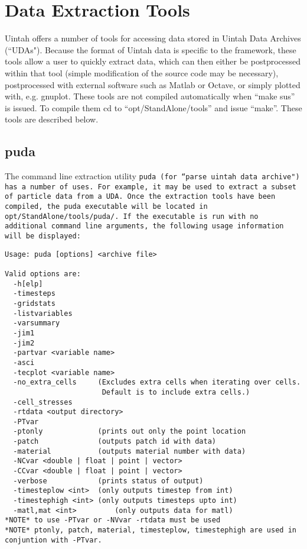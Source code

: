 \chapter{Data Extraction Tools}

Uintah offers a number of tools for accessing data stored in Uintah Data
Archives (``UDAs").  Because the format of Uintah data is specific to the
framework, these tools allow a user to quickly extract data, which can then
either be postprocessed within that tool (simple modification of the source
code may be necessary), postprocessed with external software such as
Matlab or Octave, or simply plotted with, e.g. gnuplot.  These tools are not compiled automatically when ``make sus'' is issued.  To compile them cd to ``opt/StandAlone/tools'' and issue ``make''.  These tools
are described below.

\section{puda}

The command line extraction utility \tt puda \normalfont
(for ``parse uintah data archive") has a number of uses.  For example, it
may be used to extract a subset of particle data from a UDA.  Once the
extraction tools have been compiled, the puda executable will be located in 
\tt opt/StandAlone/tools/puda/. \normalfont  If the executable is run with
no additional command line arguments, the following usage information will be
displayed:

\begin{Verbatim}[fontsize=\footnotesize]
Usage: puda [options] <archive file>

Valid options are:
  -h[elp]
  -timesteps
  -gridstats
  -listvariables
  -varsummary
  -jim1
  -jim2
  -partvar <variable name>
  -asci
  -tecplot <variable name>
  -no_extra_cells     (Excludes extra cells when iterating over cells.
                       Default is to include extra cells.)
  -cell_stresses
  -rtdata <output directory>
  -PTvar
  -ptonly             (prints out only the point location
  -patch              (outputs patch id with data)
  -material           (outputs material number with data)
  -NCvar <double | float | point | vector>
  -CCvar <double | float | point | vector>
  -verbose            (prints status of output)
  -timesteplow <int>  (only outputs timestep from int)
  -timestephigh <int> (only outputs timesteps upto int)
  -matl,mat <int>         (only outputs data for matl)
*NOTE* to use -PTvar or -NVvar -rtdata must be used
*NOTE* ptonly, patch, material, timesteplow, timestephigh are used in conjuntion with -PTvar.
\end{Verbatim}


